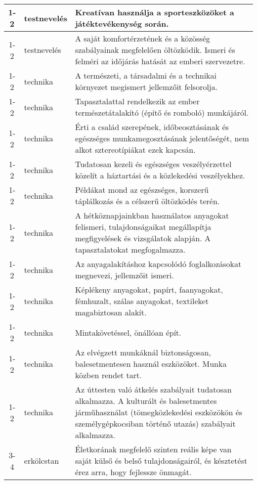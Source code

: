 \begin{small}
\begin{longtable}{c | p{2cm} |  p{11cm} }
              1-2 & testnevelés & Kreatívan használja a sporteszközöket a játéktevékenység során. \\ \hline
              1-2 & testnevelés & A saját komfortérzetének és a közösség szabályainak megfelelően öltözködik. Ismeri és felméri az időjárás hatását az emberi szervezetre. \\ \hline
              1-2 & technika & A természeti, a társadalmi és a technikai környezet megismert jellemzőit felsorolja. \\ \hline
              1-2 & technika & Tapasztalattal rendelkezik az ember természetátalakító (építő és romboló) munkájáról. \\ \hline
              1-2 & technika & Érti a család szerepének, időbeosztásának és egészséges munkamegosztásának jelentőségét, nem alkot sztereotípiákat ezek kapcsán. \\ \hline
              1-2 & technika & Tudatosan kezeli és egészséges veszélyérzettel közelít a háztartási és a közlekedési veszélyekhez. \\ \hline
              1-2 & technika & Példákat mond az egészséges, korszerű táplálkozás és a célszerű öltözködés terén. \\ \hline
              1-2 & technika & A hétköznapjainkban használatos anyagokat felismeri, tulajdonságaikat megállapítja megfigyelések és vizsgálatok alapján. A tapasztalatokat megfogalmazza. \\ \hline
              1-2 & technika & Az anyagalakításhoz kapcsolódó foglalkozásokat megnevezi, jellemzőit ismeri. \\ \hline
              1-2 & technika & Képlékeny anyagokat, papírt, faanyagokat, fémhuzalt, szálas anyagokat, textileket magabiztosan alakít. \\ \hline
              1-2 & technika & Mintakövetéssel, önállóan épít. \\ \hline
              1-2 & technika & Az elvégzett munkáknál biztonságosan, balesetmentesen használ eszközöket. Munka közben rendet tart. \\ \hline
              1-2 & technika & Az úttesten való átkelés szabályait tudatosan alkalmazza. A kulturált és balesetmentes járműhasználat (tömegközlekedési eszközökön és személygépkocsiban történő utazás) szabályait alkalmazza. \\ \hline
              3-4 & erkölcstan & Életkorának megfelelő szinten reális képe van saját külső és belső tulajdonságairól, és késztetést érez arra, hogy fejlessze önmagát. \\ \hline

\end{longtable}
\end{small}
